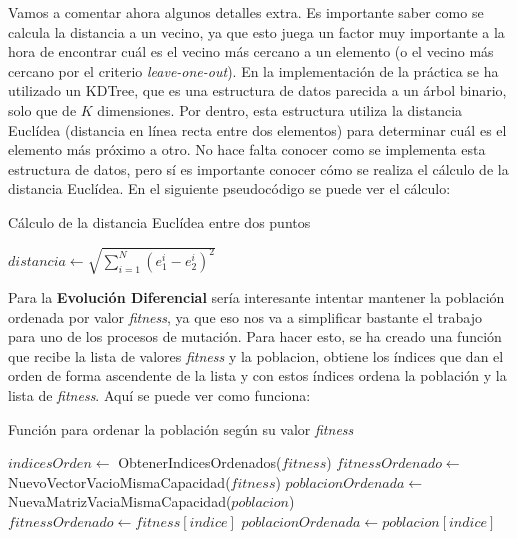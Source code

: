 \documentclass[11pt,a4paper]{article}
\begin{document}
Vamos a comentar ahora algunos detalles extra. Es importante saber como se calcula la distancia a un vecino, ya que esto juega
un factor muy importante a la hora de encontrar cuál es el vecino más cercano a un elemento (o el vecino más cercano por el
criterio \textit{leave-one-out}). En la implementación de la práctica se ha utilizado un KDTree, que es una estructura de datos
parecida a un árbol binario, solo que de $K$ dimensiones. Por dentro, esta estructura utiliza la distancia Euclídea (distancia
en línea recta entre dos elementos) para determinar cuál es el elemento más próximo a otro. No hace falta conocer como se
implementa esta estructura de datos, pero sí es importante conocer cómo se realiza el cálculo de la distancia Euclídea. En el
siguiente pseudocódigo se puede ver el cálculo:

\begin{algorithm}[H]
\caption{Cálculo de la distancia Euclídea entre dos puntos}
\begin{algorithmic}
\State $distancia \gets \sqrt{\sum_{i=1}^{N} (e_1^i - e_2^i)^2}$
\State {}
\EndFunction
\end{algorithmic}
\end{algorithm}

Para la \textbf{Evolución Diferencial} sería interesante intentar mantener la población ordenada por valor \textit{fitness}, ya que
eso nos va a simplificar bastante el trabajo para uno de los procesos de mutación. Para hacer esto, se ha creado una función que
recibe la lista de valores \textit{fitness} y la poblacion, obtiene los índices que dan el orden de forma ascendente de la lista
y con estos índices ordena la población y la lista de \textit{fitness}. Aquí se puede ver como funciona:

\begin{algorithm}
\caption{Función para ordenar la población según su valor \textit{fitness}}
\begin{algorithmic}[1]
\State $indicesOrden \gets $ ObtenerIndicesOrdenados($fitness$)
\State $fitnessOrdenado \gets$ NuevoVectorVacioMismaCapacidad($fitness$)
\State $poblacionOrdenada \gets$ NuevaMatrizVaciaMismaCapacidad($poblacion$)
	\State $fitnessOrdenado \gets fitness[indice]$
	\State $poblacionOrdenada \gets poblacion[indice]$
\EndFor
\State {}
\EndFunction
\end{algorithmic}
\end{algorithm}
\end{document}
